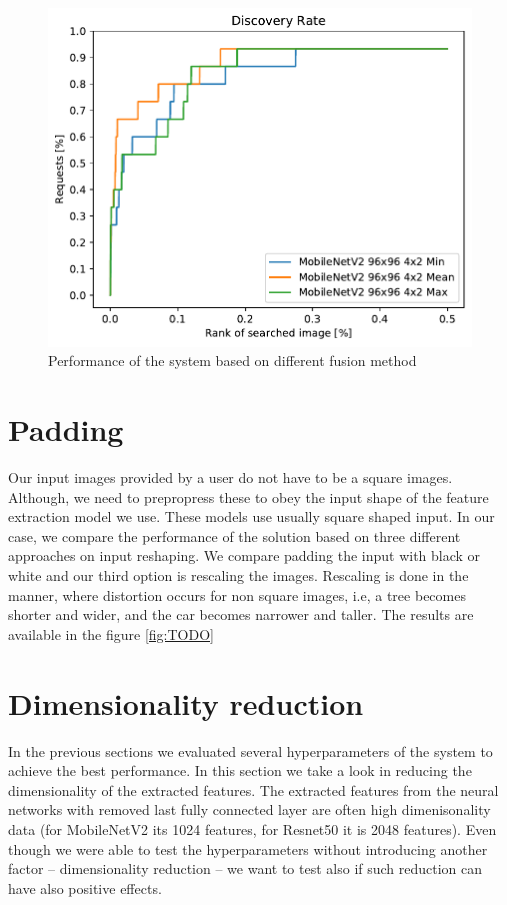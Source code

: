 \begin{figure}
\centering
\includegraphics[width=\textwidth]{graphs/362cb9a687ce05c7732f973defca88fb8c5c393f5992066521343314698c9de7}
\caption{Performance of the system based on different fusion method}
\label{fig:ranking_funcs}
\end{figure}

\section{Padding}

Our input images provided by a user do not have to be a square images. Although, we need to prepropress these to obey the input shape of the feature extraction model we use. These models use usually square shaped input. In our case, we compare the performance of the solution based on three different approaches on input reshaping. We compare padding the input with black or white and our third option is rescaling the images. Rescaling is done in the manner, where distortion occurs for non square images, i.e, a tree becomes shorter and wider, and the car becomes narrower and taller. The results are available in the figure \ref{fig:TODO}

\section{Dimensionality reduction}

In the previous sections we evaluated several hyperparameters of the system to achieve the best performance. In this section we take a look in reducing the dimensionality of the extracted features. The extracted features from the neural networks with removed last fully connected layer are often high dimenisonality data (for MobileNetV2 its 1024 features, for Resnet50 it is 2048 features). Even though we were able to test the hyperparameters without introducing another factor -- dimensionality reduction -- we want to test also if such reduction can have also positive effects.

